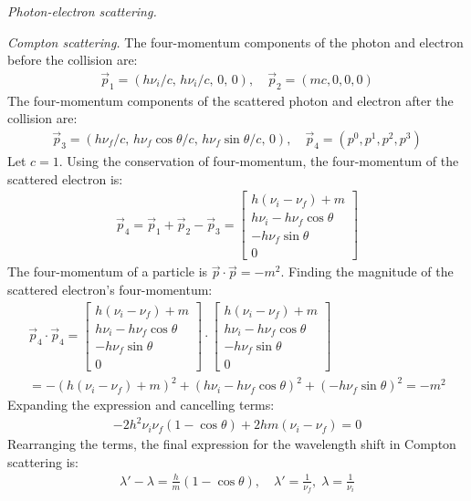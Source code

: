\documentclass{report}
\begin{document}
\begin{subquests}
	\item \emph{Photon-electron scattering.}
	\begin{subquests}
		\item \emph{Compton scattering.}
		The four-momentum components of the photon and electron before the collision are:
		\begin{gather*}
			\vec p_1 = (h\nu_i/c,\, h\nu_i/c,\, 0,\, 0), \quad \vec p_2 = (mc, 0, 0, 0)
		\end{gather*}
		The four-momentum components of the scattered photon and electron after the collision are:
		\begin{gather*}
			\vec p_3 = (h\nu_f/c,\,h\nu_f \cos\theta/c,\,h\nu_f \sin\theta/c,\,0), \quad \vec p_4 = (p^0, p^1, p^2, p^3)
		\end{gather*}
		Let $c=1$. Using the conservation of four-momentum, the four-momentum of the scattered electron is:
		\begin{gather*}
			\vec p_4 = \vec p_1 + \vec p_2 - \vec p_3 =
			\begin{bmatrix}
				h(\nu_i - \nu_f) + m \\
				h\nu_i - h\nu_f \cos\theta \\
				-h\nu_f \sin\theta \\
				0
			\end{bmatrix}
		\end{gather*}
		The four-momentum of a particle is $\vec p \cdot \vec p = -m^2$. Finding the magnitude of the scattered electron's four-momentum:
		\begin{gather*}
			{\vec p}_4 \cdot {\vec p}_4 =
			\begin{bmatrix}
				h(\nu_i - \nu_f) + m \\
				h\nu_i - h\nu_f \cos\theta \\
				-h\nu_f \sin\theta \\
				0
			\end{bmatrix} \cdot
			\begin{bmatrix}
				h(\nu_i - \nu_f) + m \\
				h\nu_i - h\nu_f \cos\theta \\
				-h\nu_f \sin\theta \\
				0
			\end{bmatrix} \\
			= -(h(\nu_i - \nu_f) + m)^2 + (h\nu_i - h\nu_f \cos\theta)^2 + (-h\nu_f \sin\theta)^2 = -m^2
		\end{gather*}
		Expanding the expression and cancelling terms:
		\begin{gather*}
			-2h^2\nu_i \nu_f (1-\cos\theta) + 2hm(\nu_i - \nu_f) = 0
		\end{gather*}
		Rearranging the terms, the final expression for the wavelength shift in Compton scattering is:
		\begin{gather*}
			\lambda' - \lambda = \frac{h}{m}(1-\cos\theta), \quad \lambda' = \frac{1}{\nu_f}, \; \lambda = \frac{1}{\nu_i}
		\end{gather*}


\end{subquests}
\end{subquests}
\end{document}

